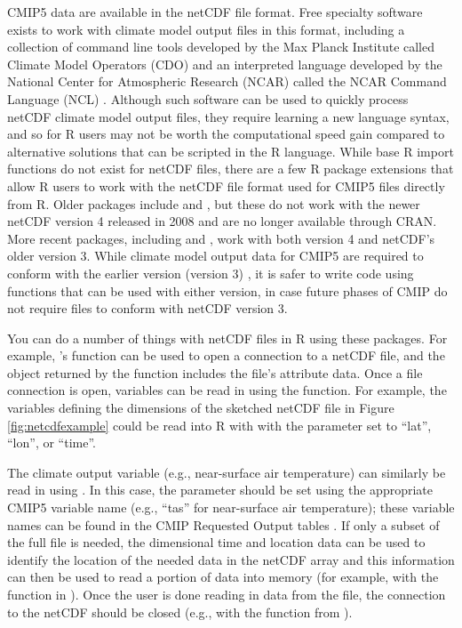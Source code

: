 CMIP5 data are available in the netCDF file format. Free specialty
software exists to work with climate model output files in this format,
including a collection of command line tools developed by the Max Planck
Institute called Climate Model Operators (CDO)
\citep{schulzweida2006cdo} and an interpreted language developed by the
National Center for Atmospheric Research (NCAR) called the NCAR Command
Language (NCL) \citep{ncl}. Although such software can be used to
quickly process netCDF climate model output files, they require learning
a new language syntax, and so for R users may not be worth the
computational speed gain compared to alternative solutions that can be
scripted in the R language. While base R import functions do not exist
for netCDF files, there are a few R package extensions that allow R
users to work with the netCDF file format used for CMIP5 files directly
from R. Older packages include  and , but these do
not work with the newer netCDF version 4 released in 2008 and are no
longer available through CRAN. More recent packages, including
 \citep{CRANncdf4} and 
\citep{michna2013rnetcdf, RNetCDF}, work with both version 4 and
netCDF's older version 3. While climate model output data for CMIP5 are
required to conform with the earlier version (version 3)
\citep{taylor2010cmip5}, it is safer to write code using functions that
can be used with either version, in case future phases of CMIP do not
require files to conform with netCDF version 3.

You can do a number of things with netCDF files in R using these
packages. For example, 's  function can be
used to open a connection to a netCDF file, and the object returned by
the function includes the file's attribute data. Once a file connection
is open, variables can be read in using the  function.
For example, the variables defining the dimensions of the sketched
netCDF file in Figure \ref{fig:netcdfexample} could be read into R with
 with the  parameter set to ``lat'',
``lon'', or ``time''.

The climate output variable (e.g., near-surface air temperature) can
similarly be read in using . In this case, the
 parameter should be set using the appropriate CMIP5
variable name (e.g., ``tas'' for near-surface air temperature); these
variable names can be found in the CMIP Requested Output tables
\citep{taylor2010cmip5}. If only a subset of the full file is needed,
the dimensional time and location data can be used to identify the
location of the needed data in the netCDF array and this information can
then be used to read a portion of data into memory (for example, with
the  function in
). Once the user is done reading in data from the
file, the connection to the netCDF should be closed (e.g., with the
 function from ).

